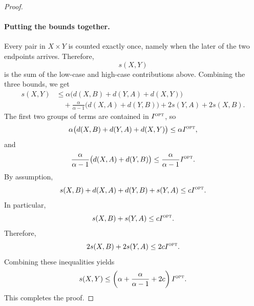 \begin{proof}
\paragraph{Putting the bounds together.}
Every pair in $X\times Y$ is counted exactly once, namely when the later of
the two endpoints arrives. Therefore,
\[
    s(X,Y)
\]
is the sum of the low-case and high-case contributions above. Combining the
three bounds, we get
\[
\begin{aligned}
    s(X,Y)
    &\le
    \alpha\bigl(d(X,B)+d(Y,A)+d(X,Y)\bigr)\\
    &\quad
    +\frac{\alpha}{\alpha-1}\bigl(d(X,A)+d(Y,B)\bigr)
    +2s(Y,A)+2s(X,B).
\end{aligned}
\]
The first two groups of terms are contained in $I^{\textsc{opt}}$, so
\[
    \alpha\bigl(d(X,B)+d(Y,A)+d(X,Y)\bigr)
    \le
    \alpha I^{\textsc{opt}},
\]
and
\[
    \frac{\alpha}{\alpha-1}\bigl(d(X,A)+d(Y,B)\bigr)
    \le
    \frac{\alpha}{\alpha-1}I^{\textsc{opt}}.
\]
By assumption,
\[
    s(X,B)+d(X,A)+d(Y,B)+s(Y,A)
    \le
    cI^{\textsc{opt}}.
\]
In particular,
\[
    s(X,B)+s(Y,A)\le cI^{\textsc{opt}}.
\]
Therefore,
\[
    2s(X,B)+2s(Y,A)\le 2cI^{\textsc{opt}}.
\]
Combining these inequalities yields
\[
    s(X,Y)
    \le
    \left(
        \alpha+\frac{\alpha}{\alpha-1}+2c
    \right)I^{\textsc{opt}}.
\]
This completes the proof.
\end{proof}
